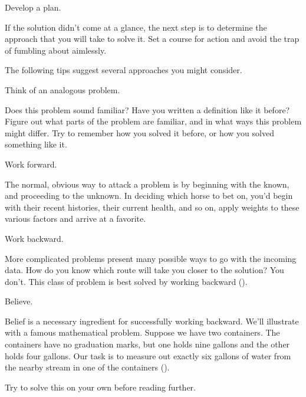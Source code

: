 \begin{tip}
Develop a plan.
\end{tip}
If the solution didn't come at a glance, the next step is to determine the
approach that you will take to solve it. Set a course for action and avoid
the trap of fumbling about aimlessly.

The following tips suggest several approaches you might consider.

\begin{tip}
Think of an analogous problem.
\end{tip}
Does this problem sound familiar? Have you written a definition like it
before? Figure out what parts of the problem are familiar, and in what
ways this problem might differ. Try to remember how you solved it
before, or how you solved something like it.

\begin{tip}
Work forward.
\end{tip}
The normal, obvious way to attack a problem is by beginning with the
known, and proceeding to the unknown. In deciding which horse to bet
on, you'd begin with their recent histories, their current health, and so on,
apply weights to these various factors and arrive at a favorite.

\begin{tip}
Work backward.
\end{tip}
More complicated problems present many possible ways to go with the
incoming data. How do you know which route will take you closer to the
solution? You don't. This class of problem is best solved by working
backward ().



\begin{tip}
Believe.
\end{tip}
Belief is a necessary ingredient for successfully working backward. We'll
illustrate with a famous mathematical problem. Suppose we have two
containers. The containers have no graduation marks, but one holds nine
gallons and the other holds four gallons. Our task is to measure out exactly
six gallons of water from the nearby stream in one of the containers
().




Try to solve this on your own before reading further.

